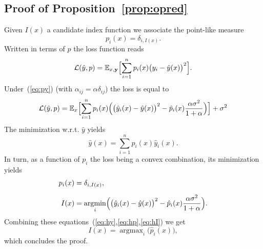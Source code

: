 \documentclass[envcountsect,runningheads]{llncs}
\theoremstyle{etoile}
\DeclareMathOperator*{\argmin}{argmin}
\DeclareMathOperator*{\argmax}{argmax}
\begin{document}
\begin{appendix}
\section{Proof of Proposition~\ref{prop:opred}}\label{app:opred}
Given $I(x)$ a candidate index function we associate the point-like measure
\[
p_i(x) = \delta_{i,I(x)}.
\]
Written in terms of $p$ the loss function reads
\[
{\cal L}(\hat y,p) = {\mathbb E}_{x,{\bf y}}\Bigl[\sum_{i=1}^n p_i(x)\bigl(y_i-\hat y(x)\bigr)^2\Bigr].
\]
Under~(\ref{eq:py}) (with $\alpha_{ij}=\alpha\delta_{ij}$) the loss is equal to
\[
{\cal L}(\hat y,p) = {\mathbb E}_x\Bigl[\sum_{i=1}^n p_i(x)\Bigl( \bigl(\hat y_i(x)-\hat y(x)\bigr)^2-\hat p_i(x)\frac{\alpha\sigma^2}{1+\alpha}\Bigr)\Bigr]+\sigma^2
\]
The minimization w.r.t. $\hat y$ yields
\begin{equation}\label{eq:hy}
\hat y(x) = \sum_{i=1}^n p_i(x)\hat y_i(x).
\end{equation}
In turn, as a function of $p_i$ the loss being a  convex combination, its minimization yields
\begin{align}
  p_i(x) &= \delta_{i,I(x)},\label{eq:hp}\\[0.2cm]
  I(x) &= \argmin_i\Bigl(\bigl(\hat y_i(x)-\hat y(x)\bigr)^2-\hat p_i(x)\frac{\alpha\sigma^2}{1+\alpha}\Bigr).\label{eq:hI}
\end{align}
Combining these equations~(\ref{eq:hy},\ref{eq:hp},\ref{eq:hI}) we get
\[
I(x) = \argmax_i\bigl(\hat p_i(x)\bigr),
\]
which concludes the proof.  

\end{appendix}


\clearpage

\end{document}
